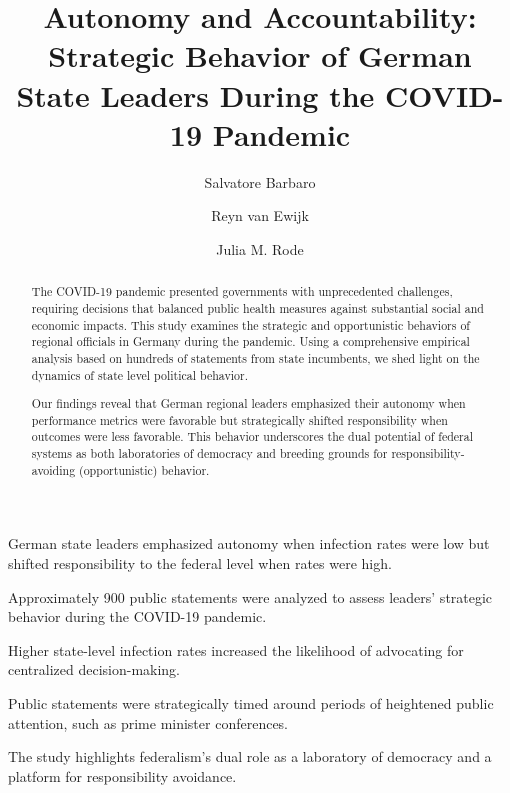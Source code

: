 \documentclass[authoryear,12pt, 3p]{elsarticle} %
\theoremstyle{break}
\begin{document}
	
\begin{frontmatter}
\title{Autonomy and Accountability: Strategic Behavior of German State Leaders During the COVID-19 Pandemic}
\author[inst1]{Salvatore Barbaro}
\author[inst2]{Reyn van Ewijk}
\author[inst3]{Julia M. Rode}
		



\begin{abstract}
The COVID-19 pandemic presented governments with unprecedented challenges, requiring decisions that balanced public health measures against substantial social and economic impacts. This study examines the strategic and opportunistic behaviors of regional officials in Germany during the pandemic. Using a comprehensive empirical analysis based on hundreds of statements from state incumbents, we shed light on the dynamics of state level political behavior.

Our findings reveal that German regional leaders emphasized their autonomy when performance metrics were favorable but strategically shifted responsibility when outcomes were less favorable. This behavior underscores the dual potential of federal systems as both laboratories of democracy and breeding grounds for responsibility-avoiding (opportunistic) behavior.
\end{abstract}
		
\begin{highlights}
\item German state leaders emphasized autonomy when infection rates were low but shifted responsibility to the federal level when rates were high.
\item Approximately 900 public statements were analyzed to assess leaders' strategic behavior during the COVID-19 pandemic.
\item Higher state-level infection rates increased the likelihood of advocating for centralized decision-making.
\item Public statements were strategically timed around periods of heightened public attention, such as prime minister conferences.
\item The study highlights federalism's dual role as a laboratory of democracy and a platform for responsibility avoidance.
\end{highlights}
		

\end{frontmatter}
\end{document}
